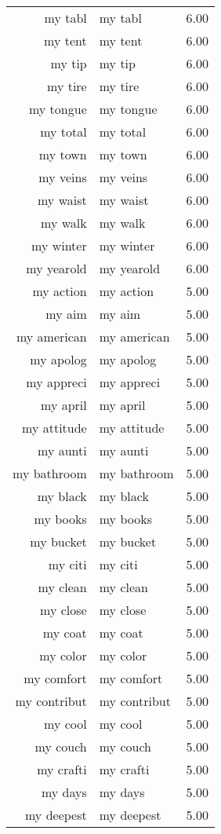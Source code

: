 \begin{table}[ht]
\begin{tabular}{rlr}
  my tabl & my tabl & 6.00 \\ 
  my tent & my tent & 6.00 \\ 
  my tip & my tip & 6.00 \\ 
  my tire & my tire & 6.00 \\ 
  my tongue & my tongue & 6.00 \\ 
  my total & my total & 6.00 \\ 
  my town & my town & 6.00 \\ 
  my veins & my veins & 6.00 \\ 
  my waist & my waist & 6.00 \\ 
  my walk & my walk & 6.00 \\ 
  my winter & my winter & 6.00 \\ 
  my yearold & my yearold & 6.00 \\ 
  my action & my action & 5.00 \\ 
  my aim & my aim & 5.00 \\ 
  my american & my american & 5.00 \\ 
  my apolog & my apolog & 5.00 \\ 
  my appreci & my appreci & 5.00 \\ 
  my april & my april & 5.00 \\ 
  my attitude & my attitude & 5.00 \\ 
  my aunti & my aunti & 5.00 \\ 
  my bathroom & my bathroom & 5.00 \\ 
  my black & my black & 5.00 \\ 
  my books & my books & 5.00 \\ 
  my bucket & my bucket & 5.00 \\ 
  my citi & my citi & 5.00 \\ 
  my clean & my clean & 5.00 \\ 
  my close & my close & 5.00 \\ 
  my coat & my coat & 5.00 \\ 
  my color & my color & 5.00 \\ 
  my comfort & my comfort & 5.00 \\ 
  my contribut & my contribut & 5.00 \\ 
  my cool & my cool & 5.00 \\ 
  my couch & my couch & 5.00 \\ 
  my crafti & my crafti & 5.00 \\ 
  my days & my days & 5.00 \\ 
  my deepest & my deepest & 5.00 \\ 

\end{tabular}
\end{table}
